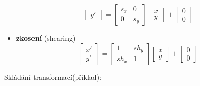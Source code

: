 \begin{itemize}
\begin{equation*}
\begin{bmatrix}
			 y'
			 \end{bmatrix} = 
			 \begin{bmatrix}
			     s_x & 0     \\[0.3em]
			     0 & s_y        
			  \end{bmatrix}
			  \begin{bmatrix}
			     x     \\[0.3em]
			     y        
			     \end{bmatrix} +
			      \begin{bmatrix}
			     0     \\[0.3em]
			     0        
			     \end{bmatrix}
				\end{equation*}
	\item \textbf{zkosení} (shearing)
				\begin{equation*}
			 \begin{bmatrix}     
			 x'   \\[0.3em]      
			 y'
			 \end{bmatrix} = 
			 \begin{bmatrix}
			     1 & sh_y     \\[0.3em]
			     sh_x & 1        
			  \end{bmatrix}
			  \begin{bmatrix}
			     x     \\[0.3em]
			     y        
			     \end{bmatrix} +
			      \begin{bmatrix}
			     0     \\[0.3em]
			     0        
			     \end{bmatrix}
				\end{equation*}
\end{itemize}
Skládání transformací(příklad):

